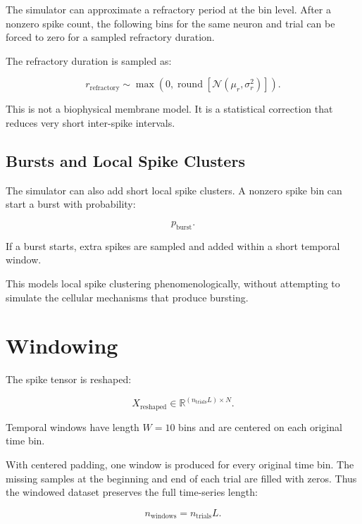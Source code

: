 \documentclass[11pt]{article}
\begin{document}
The simulator can approximate a refractory period at the bin level. After a
nonzero spike count, the following bins for the same neuron and trial can be
forced to zero for a sampled refractory duration.

The refractory duration is sampled as:

\begin{equation}
r_{\text{refractory}} \sim
\max\left(0, \operatorname{round}\left[
\mathcal{N}(\mu_r,\sigma_r^2)
\right]\right).
\end{equation}

This is not a biophysical membrane model. It is a statistical correction that
reduces very short inter-spike intervals.

\subsection{Bursts and Local Spike Clusters}

The simulator can also add short local spike clusters. A nonzero spike bin can
start a burst with probability:

\begin{equation}
p_{\text{burst}}.
\end{equation}

If a burst starts, extra spikes are sampled and added within a short temporal
window.

This models local spike clustering phenomenologically, without attempting to
simulate the cellular mechanisms that produce bursting.

\section{Windowing}

The spike tensor is reshaped:

\begin{equation}
X_{\text{reshaped}} \in
\mathbb{R}^{(n_{\text{trials}}L) \times N}.
\end{equation}

Temporal windows have length $W=10$ bins and are centered on each original
time bin.

With centered padding, one window is produced for every original time bin. The
missing samples at the beginning and end of each trial are filled with zeros.
Thus the windowed dataset preserves the full time-series length:

\begin{equation}
n_{\text{windows}} = n_{\text{trials}} L.
\end{equation}
\end{document}
